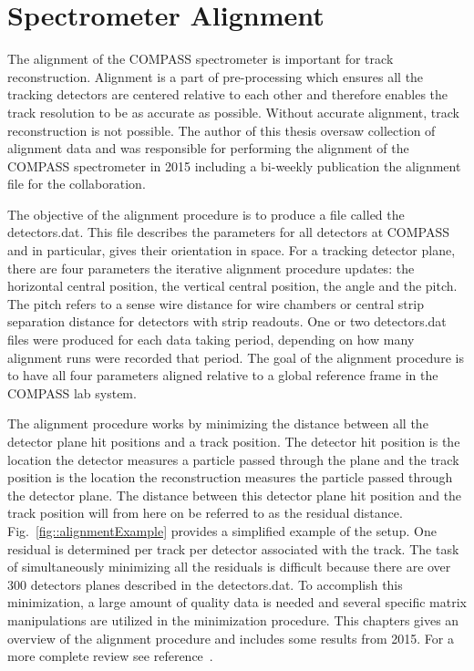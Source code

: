 \chapter{Spectrometer Alignment} \label{ch::alignment}
\ifpdf
\graphicspath{{Chapters/Alignment/Figs/}}
\fi

The alignment of the COMPASS spectrometer is important for track reconstruction.
Alignment is a part of pre-processing which ensures all the tracking detectors
are centered relative to each other and therefore enables the track resolution
to be as accurate as possible.  Without accurate alignment, track reconstruction
is not possible.  The author of this thesis oversaw collection of alignment data
and was responsible for performing the alignment of the COMPASS spectrometer in
2015 including a bi-weekly publication the alignment file for the collaboration.

The objective of the alignment procedure is to produce a file called the
detectors.dat.  This file describes the parameters for all detectors at COMPASS
and in particular, gives their orientation in space.  For a tracking detector
plane, there are four parameters the iterative alignment procedure updates: the
horizontal central position, the vertical central position, the angle and the
pitch.  The pitch refers to a sense wire distance for wire chambers or central
strip separation distance for detectors with strip readouts.  One or two
detectors.dat files were produced for each data taking period, depending on how
many alignment runs were recorded that period.  The goal of the alignment
procedure is to have all four parameters aligned relative to a global reference
frame in the COMPASS lab system.

The alignment procedure works by minimizing the distance between all the
detector plane hit positions and a track position.  The detector hit position is
the location the detector measures a particle passed through the plane and the
track position is the location the reconstruction measures the particle passed
through the detector plane.  The distance between this detector plane hit
position and the track position will from here on be referred to as the residual
distance.  Fig.~\ref{fig::alignmentExample} provides a simplified example of
the setup.  One residual is determined per track per detector associated
with the track.  The task of simultaneously minimizing all the residuals is
difficult because there are over 300 detectors planes described in the
detectors.dat.  To accomplish this minimization, a large amount of quality data
is needed and several specific matrix manipulations are utilized in the
minimization procedure.  This chapters gives an overview of the alignment
procedure and includes some results from 2015.  For a more complete review see
reference~\cite{compassAlignmentNote}.

